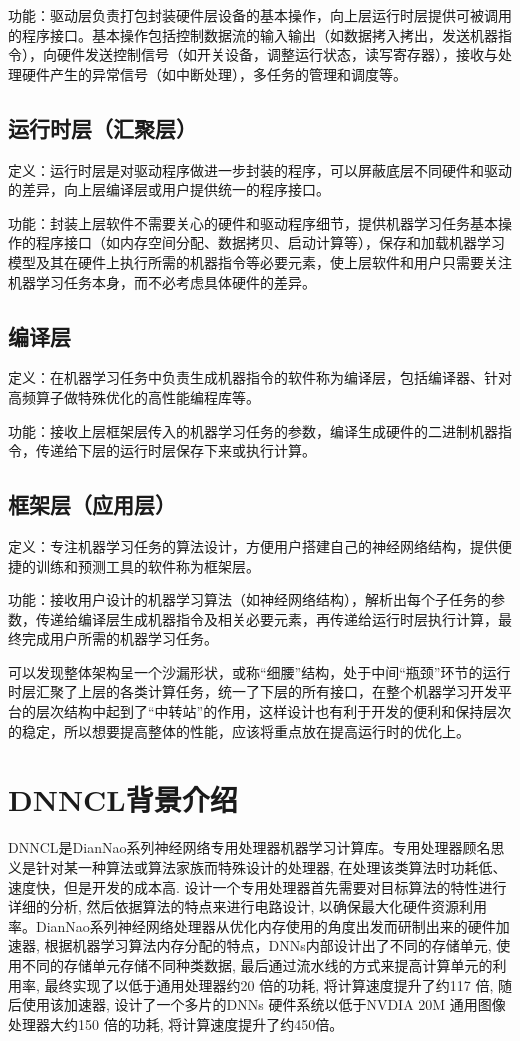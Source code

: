 功能：驱动层负责打包封装硬件层设备的基本操作，向上层运行时层提供可被调用的程序接口。基本操作包括控制数据流的输入输出（如数据拷入拷出，发送机器指令），向硬件发送控制信号（如开关设备，调整运行状态，读写寄存器），接收与处理硬件产生的异常信号（如中断处理），多任务的管理和调度等。

\subsection {运行时层（汇聚层）}
定义：运行时层是对驱动程序做进一步封装的程序，可以屏蔽底层不同硬件和驱动的差异，向上层编译层或用户提供统一的程序接口。

功能：封装上层软件不需要关心的硬件和驱动程序细节，提供机器学习任务基本操作的程序接口（如内存空间分配、数据拷贝、启动计算等），保存和加载机器学习模型及其在硬件上执行所需的机器指令等必要元素，使上层软件和用户只需要关注机器学习任务本身，而不必考虑具体硬件的差异。

\subsection {编译层}
定义：在机器学习任务中负责生成机器指令的软件称为编译层，包括编译器、针对高频算子做特殊优化的高性能编程库等\cite{randy}。

功能：接收上层框架层传入的机器学习任务的参数，编译生成硬件的二进制机器指令，传递给下层的运行时层保存下来或执行计算。

\subsection {框架层（应用层）}
定义：专注机器学习任务的算法设计，方便用户搭建自己的神经网络结构，提供便捷的训练和预测工具的软件称为框架层。

功能：接收用户设计的机器学习算法（如神经网络结构），解析出每个子任务的参数，传递给编译层生成机器指令及相关必要元素，再传递给运行时层执行计算，最终完成用户所需的机器学习任务。

可以发现整体架构呈一个沙漏形状，或称“细腰”结构，处于中间“瓶颈”环节的运行时层汇聚了上层的各类计算任务，统一了下层的所有接口，在整个机器学习开发平台的层次结构中起到了“中转站”的作用，这样设计也有利于开发的便利和保持层次的稳定，所以想要提高整体的性能，应该将重点放在提高运行时的优化上。

\section{DNNCL背景介绍}
DNNCL是DianNao系列神经网络专用处理器机器学习计算库。专用处理器顾名思义是针对某一种算法或算法家族而特殊设计的处理器, 在处理该类算法时功耗低、速度快，但是开发的成本高. 设计一个专用处理器首先需要对目标算法的特性进行详细的分析, 然后依据算法的特点来进行电路设计, 以确保最大化硬件资源利用率\cite{zhangweihua}。DianNao系列神经网络处理器从优化内存使用的角度出发而研制出来的硬件加速器, 根据机器学习算法内存分配的特点，DNNs内部设计出了不同的存储单元, 使用不同的存储单元存储不同种类数据, 最后通过流水线的方式来提高计算单元的利用率, 最终实现了以低于通用处理器约20 倍的功耗, 将计算速度提升了约117 倍, 随后使用该加速器, 设计了一个多片的DNNs 硬件系统以低于NVDIA 20M 通用图像处理器大约150 倍的功耗, 将计算速度提升了约450倍\cite{sparsenet}。

